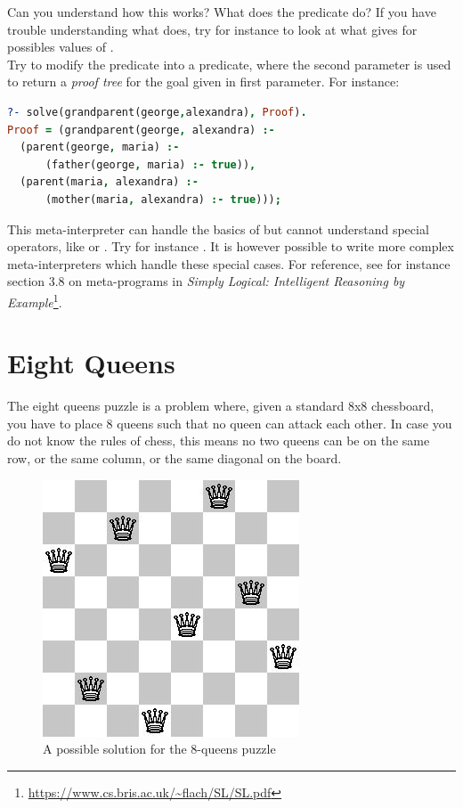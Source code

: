 \documentclass{../../../tp}
\begin{document}
\begin{instruction}
	Can you understand how this works? What does the  predicate do? If you have trouble understanding what   does, try for instance to look at what  gives for possibles values of . \\
	
	Try to modify the  predicate into a  predicate, where the second parameter is used to return a \emph{proof tree} for the goal given in first parameter. For instance:
	
	\begin{lstlisting}[language=prolog]
?- solve(grandparent(george,alexandra), Proof).
Proof = (grandparent(george, alexandra) :- 
  (parent(george, maria) :- 
      (father(george, maria) :- true)),
  (parent(maria, alexandra) :- 
      (mother(maria, alexandra) :- true)));
	\end{lstlisting}
\end{instruction}

This meta-interpreter can handle the basics of \prolog but cannot understand special operators, like \prologcode{=} or \prologcode{>}. Try for instance . It is however possible to write more complex meta-interpreters which handle these special cases. For reference, see for instance section 3.8 on meta-programs in \emph{Simply Logical: Intelligent Reasoning by Example}\footnote{\url{https://www.cs.bris.ac.uk/~flach/SL/SL.pdf}}.

\section{Eight Queens}

The eight queens puzzle is a problem where, given a standard 8x8 chessboard, you have to place 8 queens such that no queen can attack each other. In case you do not know the rules of chess, this means no two queens can be on the same row, or the same column, or the same diagonal on the board. 

\begin{figure}[h]
	\centering
	\includegraphics[scale=0.5]{8queens}
	\captionsetup{labelformat=empty}
	\caption{A possible solution for the 8-queens puzzle}
\end{figure}
\end{document}
